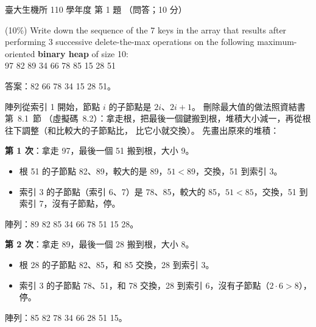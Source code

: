 \begin{pastexam}[label={px:ntu-110-bime-ds-01}]{臺大生機所 110 學年度 第 1 題}
（問答；10 分）

(10\%) Write down the sequence of the 7 keys in the array that results after performing 3 successive
delete-the-max operations on the following maximum-oriented \textbf{binary heap} of size 10:\\
\hspace*{1em}97 82 89 34 66 78 85 15 28 51
\end{pastexam}

\begin{pastsoln}
答案：82 66 78 34 15 28 51。

陣列從索引 1 開始，節點 $i$ 的子節點是 $2i$、$2i+1$。 刪除最大值的做法照資結書第~8.1~節
（虛擬碼~8.2）：拿走根，把最後一個鍵搬到根，堆積大小減一，再從根往下調整（和比較大的子節點比，
比它小就交換）。 先畫出原來的堆積：
\begin{center}
\end{center}

\textbf{第 1 次}：拿走 97，最後一個 51 搬到根，大小 9。
\begin{itemize}[nosep]
\item 根 51 的子節點 82、89，較大的是 89，$51 < 89$，交換，51 到索引 3。
\item 索引 3 的子節點（索引 6、7）是 78、85，較大的 85，$51 < 85$，交換，51 到索引 7，沒有子節點，停。
\end{itemize}
陣列：89 82 85 34 66 78 51 15 28。

\textbf{第 2 次}：拿走 89，最後一個 28 搬到根，大小 8。
\begin{itemize}[nosep]
\item 根 28 的子節點 82、85，和 85 交換，28 到索引 3。
\item 索引 3 的子節點 78、51，和 78 交換，28 到索引 6，沒有子節點（$2\cdot 6 > 8$），停。
\end{itemize}
陣列：85 82 78 34 66 28 51 15。


\end{pastsoln}
